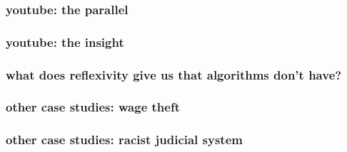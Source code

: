 \documentclass[presentation]{subfiles}
\begin{document}
\begin{frame}\frametitle{youtube: the parallel}

\end{frame}


\begin{frame}\frametitle{youtube: the insight}

\end{frame}


\begin{frame}\frametitle{what does reflexivity give us that algorithms don't have?}

\end{frame}



\begin{frame}\frametitle{other case studies: wage theft}

\end{frame}


\begin{frame}\frametitle{other case studies: racist judicial system}

\end{frame}
\end{document}
